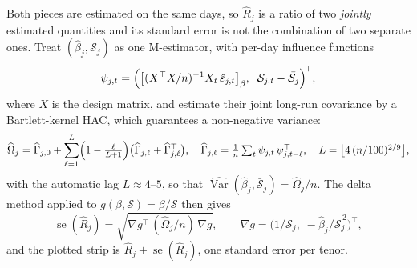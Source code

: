 \documentclass[11pt]{article}
\providecommand{\1}{\mathbf 1}
\begin{document}
Both pieces are estimated on the same days, so $\widehat R_j$ is a ratio of two \emph{jointly}
estimated quantities and its standard error is not the combination of two separate ones. Treat
$(\hat\beta_j,\bar{\mathcal S}_j)$ as one M-estimator, with per-day influence functions
\begin{equation}
  \psi_{j,t}=\Bigl(\bigl[(X^\top X/n)^{-1}X_t\,\hat\varepsilon_{j,t}\bigr]_{\beta},\;\;
                   \mathcal S_{j,t}-\bar{\mathcal S}_j\Bigr)^{\!\top},
\end{equation}
where $X$ is the design matrix, and estimate their joint long-run covariance by a Bartlett-kernel
HAC, which guarantees a non-negative variance:
\begin{equation}
  \widehat\Omega_j=\widehat\Gamma_{j,0}
   +\sum_{\ell=1}^{L}\Bigl(1-\tfrac{\ell}{L+1}\Bigr)
    \bigl(\widehat\Gamma_{j,\ell}+\widehat\Gamma_{j,\ell}^{\top}\bigr),
  \quad
  \widehat\Gamma_{j,\ell}=\tfrac1n\textstyle\sum_t\psi_{j,t}\,\psi_{j,t-\ell}^{\top},
  \quad
  L=\bigl\lfloor 4\,(n/100)^{2/9}\bigr\rfloor,
\end{equation}
with the automatic lag $L\approx4$--$5$, so that
$\widehat{\operatorname{Var}}(\hat\beta_j,\bar{\mathcal S}_j)=\widehat\Omega_j/n$. The delta method
applied to $g(\beta,\mathcal S)=\beta/\mathcal S$ then gives
\begin{equation}
  \operatorname{se}(\widehat{R}_j)=\sqrt{\nabla g^{\top}\,(\widehat\Omega_j/n)\,\nabla g},
  \qquad
  \nabla g=\bigl(1/\bar{\mathcal S}_j,\;-\hat\beta_j/\bar{\mathcal S}_j^{\,2}\bigr)^{\!\top},
  \label{eq:hac-joint}
\end{equation}
and the plotted strip is $\widehat{R}_j\pm\operatorname{se}(\widehat{R}_j)$, one standard error per tenor.
\end{document}
